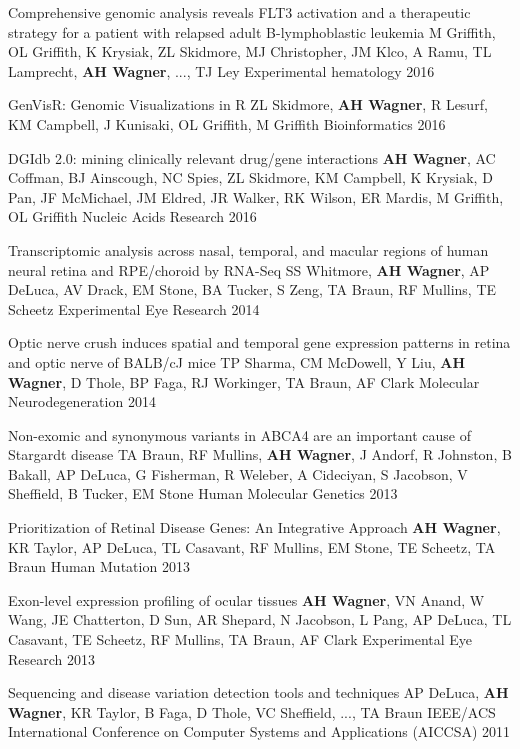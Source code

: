 \pub
{Comprehensive genomic analysis reveals FLT3 activation and a therapeutic strategy for a patient with relapsed adult B-lymphoblastic leukemia}
{M Griffith, OL Griffith, K Krysiak, ZL Skidmore, MJ Christopher, JM Klco, A Ramu, TL Lamprecht, {\bf AH Wagner}, ..., {TJ Ley}}
{Experimental hematology}
{2016}

\pub
{GenVisR: Genomic Visualizations in R}
{ZL Skidmore, {\bf AH Wagner}, R Lesurf, KM Campbell, J Kunisaki, OL Griffith, M Griffith}
{Bioinformatics}
{2016}

\pub
{DGIdb 2.0: mining clinically relevant drug/gene interactions}
{{\bf AH Wagner}, AC Coffman, BJ Ainscough, NC Spies, ZL Skidmore, KM Campbell, K Krysiak, D Pan, JF McMichael, JM Eldred, JR Walker, RK Wilson, ER Mardis, M Griffith, OL Griffith}
{Nucleic Acids Research}
{2016}

\pub
{Transcriptomic analysis across nasal, temporal, and macular regions of human neural retina and RPE/choroid by RNA-Seq}
{SS Whitmore, {\bf AH Wagner}, AP DeLuca, AV Drack, EM Stone, BA Tucker, S Zeng, TA Braun, RF Mullins, TE Scheetz}
{Experimental Eye Research}
{2014}

\pub
{Optic nerve crush induces spatial and temporal gene expression patterns in retina and optic nerve of BALB/cJ mice}
{TP Sharma, CM McDowell, Y Liu, {\bf AH Wagner}, D Thole, BP Faga, RJ Workinger, TA Braun, AF Clark}
{Molecular Neurodegeneration}
{2014}

\pub
{Non-exomic and synonymous variants in ABCA4 are an important cause of Stargardt disease}
{TA Braun, RF Mullins, {\bf AH Wagner}, J Andorf, R Johnston, B Bakall, AP DeLuca, G Fisherman, R Weleber, A Cideciyan, S Jacobson, V Sheffield, B Tucker, EM Stone}
{Human Molecular Genetics}
{2013}

\pub
{Prioritization of Retinal Disease Genes: An Integrative Approach}
{{\bf AH Wagner}, KR Taylor, AP DeLuca, TL Casavant, RF Mullins, EM Stone, TE Scheetz, TA Braun}
{Human Mutation}
{2013}

\pub
{Exon-level expression profiling of ocular tissues}
{{\bf AH Wagner}, VN Anand, W Wang, JE Chatterton, D Sun, AR Shepard, N Jacobson, L Pang, AP DeLuca, TL Casavant, TE Scheetz, RF Mullins, TA Braun, AF Clark}
{Experimental Eye Research}
{2013}

\pub
{Sequencing and disease variation detection tools and techniques}
{AP DeLuca, {\bf AH Wagner}, KR Taylor, B Faga, D Thole, VC Sheffield, ..., TA Braun}
{IEEE/ACS International Conference on Computer Systems and Applications (AICCSA)}
{2011}

